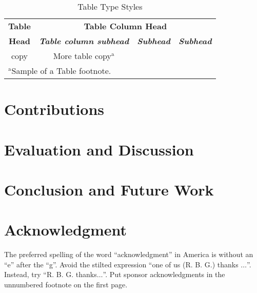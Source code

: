 \documentclass[conference]{IEEEtran}
\begin{document}
\begin{table}[htbp]
\caption{Table Type Styles}
\begin{center}
\begin{tabular}{|c|c|c|c|}
\hline
\textbf{Table}&\multicolumn{3}{|c|}{\textbf{Table Column Head}} \\
\cline{2-4} 
\textbf{Head} & \textbf{\textit{Table column subhead}}& \textbf{\textit{Subhead}}& \textbf{\textit{Subhead}} \\
\hline
copy& More table copy$^{\mathrm{a}}$& &  \\
\hline
\multicolumn{4}{l}{$^{\mathrm{a}}$Sample of a Table footnote.}
\end{tabular}
\label{tab1}
\end{center}
\end{table}


\section{Contributions}



\section{Evaluation and Discussion}



\section{Conclusion and Future Work}



\section*{Acknowledgment}

The preferred spelling of the word ``acknowledgment'' in America is without 
an ``e'' after the ``g''. Avoid the stilted expression ``one of us (R. B. 
G.) thanks $\ldots$''. Instead, try ``R. B. G. thanks$\ldots$''. Put sponsor 
acknowledgments in the unnumbered footnote on the first page.



\end{document}
